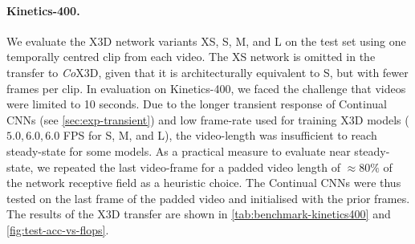 \paragraph{Kinetics-400.}
We evaluate the X3D network variants XS, S, M, and L on the test set using one temporally centred clip from each video. 
The XS network is omitted in the transfer to \textit{Co}X3D, given that it is architecturally equivalent to S, but with fewer frames per clip. 
In evaluation on Kinetics-400, we faced the challenge that videos were limited to 10 seconds. 
Due to the longer transient response of Continual CNNs (see \cref{sec:exp-transient}) and low frame-rate used for training X3D models ($5.0, 6.0, 6.0$ FPS for S, M, and L), the video-length was insufficient to reach steady-state for some models.
As a practical measure to evaluate near steady-state, we repeated the last video-frame for a padded video length of $\approx80\%$ of the network receptive field as a heuristic choice.
The Continual CNNs were thus tested on the last frame of the padded video and initialised with the prior frames. 
The results of the X3D transfer are shown in \cref{tab:benchmark-kinetics400} and \cref{fig:test-acc-vs-flops}.



